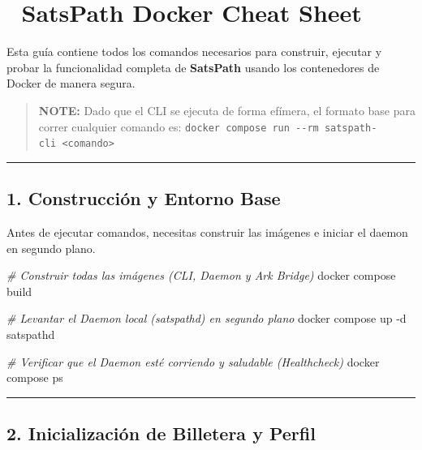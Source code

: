 \documentclass[
]{article}
\author{}
\date{}
\newenvironment{Shaded}{}{}
\newcommand{\AttributeTok}[1]{\textcolor[rgb]{0.49,0.56,0.16}{#1}}
\newcommand{\CommentTok}[1]{\textcolor[rgb]{0.38,0.63,0.69}{\textit{#1}}}
\newcommand{\ExtensionTok}[1]{#1}
\newcommand{\NormalTok}[1]{#1}
\begin{document}
\hypertarget{satspath-docker-cheat-sheet}{%
\section{🐳 SatsPath Docker Cheat
Sheet}\label{satspath-docker-cheat-sheet}}

Esta guía contiene todos los comandos necesarios para construir,
ejecutar y probar la funcionalidad completa de \textbf{SatsPath} usando
los contenedores de Docker de manera segura.

\begin{quote}
\textbf{NOTE:} Dado que el CLI se ejecuta de forma efímera, el formato
base para correr cualquier comando es:
\texttt{docker\ compose\ run\ -\/-rm\ satspath-cli\ \textless{}comando\textgreater{}}
\end{quote}

\begin{center}\rule{0.5\linewidth}{0.5pt}\end{center}

\hypertarget{construcciuxf3n-y-entorno-base}{%
\subsection{1. Construcción y Entorno
Base}\label{construcciuxf3n-y-entorno-base}}

Antes de ejecutar comandos, necesitas construir las imágenes e iniciar
el daemon en segundo plano.

\begin{Shaded}
\begin{Highlighting}[]
\CommentTok{\# Construir todas las imágenes (CLI, Daemon y Ark Bridge)}
\ExtensionTok{docker}\NormalTok{ compose build}

\CommentTok{\# Levantar el Daemon local (satspathd) en segundo plano}
\ExtensionTok{docker}\NormalTok{ compose up }\AttributeTok{{-}d}\NormalTok{ satspathd}

\CommentTok{\# Verificar que el Daemon esté corriendo y saludable (Healthcheck)}
\ExtensionTok{docker}\NormalTok{ compose ps}
\end{Highlighting}
\end{Shaded}

\begin{center}\rule{0.5\linewidth}{0.5pt}\end{center}

\hypertarget{inicializaciuxf3n-de-billetera-y-perfil}{%
\subsection{2. Inicialización de Billetera y
Perfil}\label{inicializaciuxf3n-de-billetera-y-perfil}}
\end{document}

